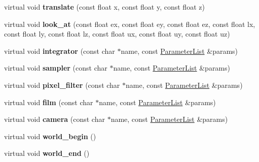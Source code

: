 \begin{DoxyCompactItemize}
virtual void {\bfseries translate} (const float x, const float y, const float z)
\item 
\mbox{\label{structpbrt_1_1_echo_importer_a39816b83347dff95568da3a3f49f212d}} 
virtual void {\bfseries look\+\_\+at} (const float ex, const float ey, const float ez, const float lx, const float ly, const float lz, const float ux, const float uy, const float uz)
\item 
\mbox{\label{structpbrt_1_1_echo_importer_a9ed058ab639b5833d09edbc7d4c49947}} 
virtual void {\bfseries integrator} (const char $\ast$name, const \hyperlink{structpbrt_1_1_parameter_list}{Parameter\+List} \&params)
\item 
\mbox{\label{structpbrt_1_1_echo_importer_a1b7c555b077fe0d2332e75182656b23b}} 
virtual void {\bfseries sampler} (const char $\ast$name, const \hyperlink{structpbrt_1_1_parameter_list}{Parameter\+List} \&params)
\item 
\mbox{\label{structpbrt_1_1_echo_importer_af6cc3a21cae00cd32212012708cfaf70}} 
virtual void {\bfseries pixel\+\_\+filter} (const char $\ast$name, const \hyperlink{structpbrt_1_1_parameter_list}{Parameter\+List} \&params)
\item 
\mbox{\label{structpbrt_1_1_echo_importer_af1c39c46746610b47be176dec3d10a20}} 
virtual void {\bfseries film} (const char $\ast$name, const \hyperlink{structpbrt_1_1_parameter_list}{Parameter\+List} \&params)
\item 
\mbox{\label{structpbrt_1_1_echo_importer_ac08d3874603449ce71e3341149dc44e4}} 
virtual void {\bfseries camera} (const char $\ast$name, const \hyperlink{structpbrt_1_1_parameter_list}{Parameter\+List} \&params)
\item 
\mbox{\label{structpbrt_1_1_echo_importer_a08f8cdc01a3fcf47dfe312e845c1d078}} 
virtual void {\bfseries world\+\_\+begin} ()
\item 
\mbox{\label{structpbrt_1_1_echo_importer_ad8d458bc27c85e9b79c3023e1ff4e43a}} 
virtual void {\bfseries world\+\_\+end} ()

\end{DoxyCompactItemize}
